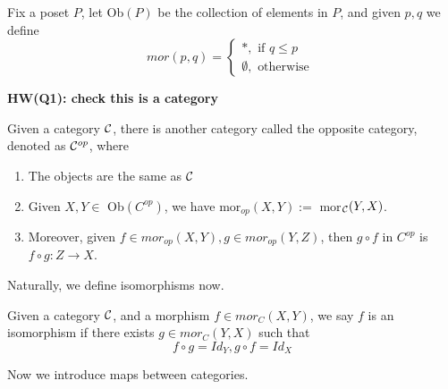 \begin{example}[Posets]
    Fix a poset $P$, let Ob$(P)$ be the collection of elements in $P$, and given $p,q$ we define 
    \begin{equation*}
        mor(p,q)=\begin{cases}
            *, \text{ if } q\leq p\\
            \emptyset, \text{ otherwise }
        \end{cases}
    \end{equation*}
\end{example}
\begin{prob}
    \textbf{HW(Q1): check this is a category}
\end{prob}
\begin{example}
    Given a category $\mathcal{C}$, there is another category called the opposite category, denoted as $\mathcal{C}^{op}$, where 
    \begin{enumerate}
        \item The objects are the same as $\mathcal{C}$
        \item Given $X,Y\in$ Ob$(C^{op})$, we have mor$_{op}(X,Y):=$ mor$_{\mathcal{C}}(Y,X)$. 
        \item Moreover, given $f\in mor_{op}(X,Y), g\in mor_{op}(Y,Z)$, then $g\circ f$ in $C^{op}$ is $f\circ g: Z\to X$.
    \end{enumerate}
\end{example}
Naturally, we define isomorphisms now.
\begin{defn}[isomorphism]
    Given a category $\mathcal{C}$, and a morphism $f\in mor_C(X,Y)$, we say $f$ is an isomorphism if there exists $g\in mor_C(Y,X)$ such that 
    \begin{equation*}
        f\circ g=Id_Y, g\circ f=Id_X
    \end{equation*}
\end{defn}
Now we introduce maps between categories.
